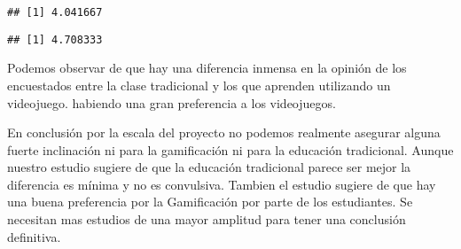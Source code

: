 \documentclass[
]{article}
\newenvironment{Shaded}{\begin{snugshade}}{\end{snugshade}}
\newcommand{\AttributeTok}[1]{\textcolor[rgb]{0.77,0.63,0.00}{#1}}
\newcommand{\FunctionTok}[1]{\textcolor[rgb]{0.00,0.00,0.00}{#1}}
\newcommand{\NormalTok}[1]{#1}
\newcommand{\SpecialCharTok}[1]{\textcolor[rgb]{0.00,0.00,0.00}{#1}}
\newcommand{\StringTok}[1]{\textcolor[rgb]{0.31,0.60,0.02}{#1}}
\begin{document}
\begin{verbatim}
## [1] 4.041667
\end{verbatim}

\begin{Shaded}
\end{Shaded}

\begin{verbatim}
## [1] 4.708333
\end{verbatim}

Podemos observar de que hay una diferencia inmensa en la opinión de los
encuestados entre la clase tradicional y los que aprenden utilizando un
videojuego. habiendo una gran preferencia a los videojuegos.

En conclusión por la escala del proyecto no podemos realmente asegurar
alguna fuerte inclinación ni para la gamificación ni para la educación
tradicional. Aunque nuestro estudio sugiere de que la educación
tradicional parece ser mejor la diferencia es mínima y no es convulsiva.
Tambien el estudio sugiere de que hay una buena preferencia por la
Gamificación por parte de los estudiantes. Se necesitan mas estudios de
una mayor amplitud para tener una conclusión definitiva.
\end{document}
